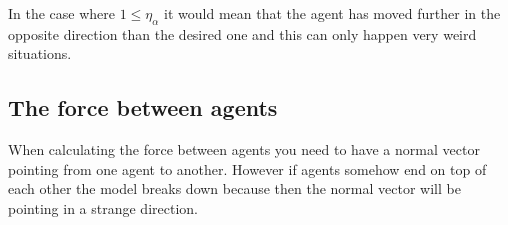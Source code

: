 \documentclass[danish,a4paper]{article}
\begin{document}
In the case where $1 \leq \eta_{\alpha}$ it would mean that the agent has moved 
further in the opposite direction than the desired one and this can only happen very 
weird situations.

\subsection{The force between agents}
When calculating the force between agents you need to have a normal vector 
pointing from one agent to another. However if agents somehow end on top of 
each other the model breaks down because then the normal vector will be pointing 
in a strange direction.
\end{document}
